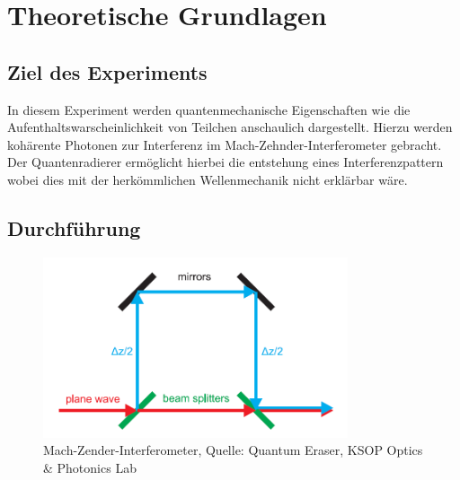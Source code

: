 \documentclass{include/thesisclass3}
\begin{document}
	\FrontMatter
	
	\tableofcontents                  
	\newpage
	\MainMatter


\chapter{Theoretische Grundlagen}

\section{Ziel des Experiments}

In diesem Experiment werden quantenmechanische Eigenschaften wie die Aufenthaltswarscheinlichkeit von Teilchen anschaulich dargestellt. Hierzu werden kohärente Photonen zur Interferenz im Mach-Zehnder-Interferometer gebracht. Der Quantenradierer ermöglicht hierbei die entstehung eines Interferenzpattern wobei dies mit der herkömmlichen Wellenmechanik nicht erklärbar wäre.

\section{Durchführung}
\begin{figure}[H]
	\begin{center}
		\includegraphics[width=0.8\textwidth]{images/Beamsplit.png}
		\caption{Mach-Zender-Interferometer, Quelle: Quantum Eraser, KSOP Optics \& Photonics Lab}
		\label{Mach-Zehnder}
	\end{center}
\end{figure}
\end{document}
